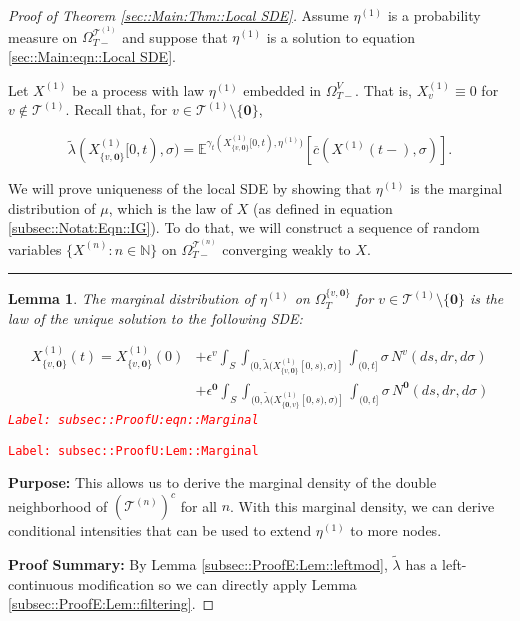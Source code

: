 \documentclass[12pt]{article}
\newcommand{\mb}{\mathbb}
\newcommand{\mc}{\mathcal}
\newcommand{\ov}{\overline}
\newcommand{\ep}{\epsilon}
\newcommand{\tr}{\textcolor{red}}
\newcommand{\labe}[1]{\tr{\texttt{Label: #1}}}
\newcommand{\purpose}{\textbf{Purpose: }}
\newcommand{\pfsum}{\textbf{Proof Summary: }}
\newcommand{\ind}{\hspace{24pt}}
\newcommand{\lin}{\rule{\linewidth}{0.4 pt}}
\newcommand{\exmu}[2]{\mb{E}^{#1}\left[#2\right]}	%
\renewcommand{\root}{\mathbf{0}}				%
\renewcommand{\v}{v}							%
\renewcommand{\S}{S}							%
\newcommand{\s}{\sigma}							%
\newcommand{\ev}{\ep}							%
\newcommand{\T}{T}								%
\renewcommand{\t}{t}							%
\newcommand{\sset}{\Omega}						%
\renewcommand{\tt}{s}							%
\newcommand{\X}{X}								%
\newcommand{\vind}[1]{^{#1}}					%
\newcommand{\vsi}[1]{^{#1}}						%
\newcommand{\cind}[1]{_{#1}}					%
\newcommand{\tp}[1]{(#1)}						%
\newcommand{\tip}[1]{#1}						%
\newcommand{\ts}[1]{_{#1}}						%
\newcommand{\IGrg}{\ov{c}}						%
\newcommand{\tree}{\mc{T}}						%
\newcommand{\sln}[1]{^{(#1)}}					%
\newcommand{\poiss}{N}							%
\renewcommand{\r}{r}							%
\newcommand{\alt}[1]{\widetilde{#1}}			%
\newcommand{\m}{\mu}							%
\newcommand{\mmm}{\eta}							%
\newcommand{\cm}{\gamma}						%
\newcommand{\crate}{\alt{\lambda}}				%
\newtheorem{lem}[thms]{Lemma}
\begin{document}
\begin{proof}[Proof of Theorem \ref{sec::Main:Thm::Local SDE}]

Assume \(\mmm\sln{1}\) is a probability measure on \(\sset\vsi{\tree\sln{1}}\ts{\T-}\) and suppose that \(\mmm\sln{1}\) is a solution to equation \eqref{sec::Main:eqn::Local SDE}.

\ind Let \(\X\sln{1}\) be a process with law \(\mmm\sln{1}\) embedded in \(\sset\vsi{V}\ts{\T-}\). That is, \(\X\sln{1}\cind{\v} \equiv 0\) for \(\v \notin \tree\sln{1}\). Recall that, for \(\v \in \tree\sln{1}\setminus\{\root\}\),

\[\crate(\X\sln{1}\cind{\{\v,\root\}}\tip{[0,\t)},\s) = \exmu{\cm\ts{\t}(\X\sln{1}\cind{\{\v,\root\}}\tip{[0,\t)},\mmm\sln{1})}{\IGrg(\X\sln{1}\tp{\t-},\s)}.\]

\ind We will prove uniqueness of the local SDE by showing that \(\mmm\sln{1}\) is the marginal distribution of \(\m\), which is the law of \(\X\) (as defined in equation \eqref{subsec::Notat:Eqn::IG}). To do that, we will construct a sequence of random variables \(\{\X\sln{n}:n\in\mb{N}\}\) on \(\sset\vsi{\tree\sln{n}}\ts{\T-}\) converging weakly to \(\X\). 

\lin

\begin{lem}
The marginal distribution of \(\mmm\sln{1}\) on \(\sset\vsi{\{\v,\root\}}\ts{\T}\) for \(\v \in \tree\sln{1}\setminus\{\root\}\) is the law of the unique solution to the following SDE:

\begin{align}
\X\sln{1}\cind{\{\v,\root\}}\tp{\t} = \X\sln{1}\cind{\{\v,\root\}}\tp{0} &+ \ev\vind{\v}\int_\S\int_{(0,\crate(\X\sln{1}\cind{\{\v,\root\}}\tip{[0,\tt)},\s)]}\int_{(0,\t]}\s\,\poiss\vind{\v}(d\tt,d\r,d\s)\nonumber\\
&+ \ev\vind{\root}\int_\S\int_{(0,\crate(\X\sln{1}\cind{\{\root,\v\}}\tip{[0,\tt)},\s)]}\int_{(0,\t]}\s\,\poiss\vind{\root}(d\tt,d\r,d\s)
\label{subsec::ProofU:eqn::Marginal}
\end{align}
\labe{subsec::ProofU:eqn::Marginal}
\label{subsec::ProofU:Lem::Marginal}
\end{lem}
\labe{subsec::ProofU:Lem::Marginal}

\purpose This allows us to derive the marginal density of the double neighborhood of \((\tree\sln{n})^c\) for all \(n\). With this marginal density, we can derive conditional intensities that can be used to extend \(\mmm\sln{1}\) to more nodes.

\pfsum By Lemma \ref{subsec::ProofE:Lem::leftmod}, \(\crate\) has a left-continuous modification so we can directly apply Lemma \ref{subsec::ProofE:Lem::filtering}.


\end{proof}
\end{document}
